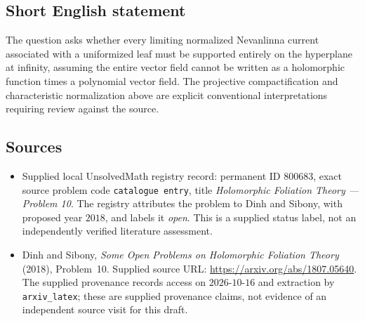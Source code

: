 \documentclass[11pt]{article}
\begin{document}
\subsection{Short English statement}
The question asks whether every limiting normalized Nevanlinna current associated with a uniformized leaf must be supported entirely on the hyperplane at infinity, assuming the entire vector field cannot be written as a holomorphic function times a polynomial vector field. The projective compactification and characteristic normalization above are explicit conventional interpretations requiring review against the source.
\subsection{Sources}
\begin{itemize}
\item Supplied local UnsolvedMath registry record: permanent ID \(800683\), exact source problem code \texttt{catalogue entry}, title \emph{Holomorphic Foliation Theory --- Problem 10}. The registry attributes the problem to Dinh and Sibony, with proposed year \(2018\), and labels it \emph{open}. This is a supplied status label, not an independently verified literature assessment.
\item Dinh and Sibony, \emph{Some Open Problems on Holomorphic Foliation Theory} (2018), Problem~10. Supplied source URL: \url{https://arxiv.org/abs/1807.05640}. The supplied provenance records access on \(2026\text{-}10\text{-}16\) and extraction by \texttt{arxiv\_latex}; these are supplied provenance claims, not evidence of an independent source visit for this draft.
\end{itemize}
\end{document}
